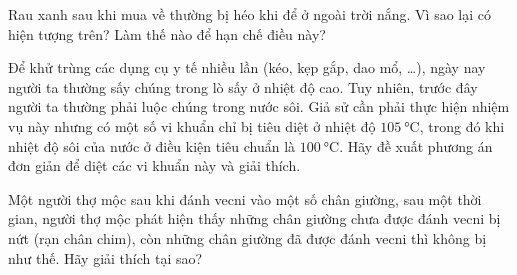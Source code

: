 \begin{ex}
	Rau xanh sau khi mua về thường bị héo khi để ở ngoài trời nắng. Vì sao lại có hiện tượng trên? Làm thế nào để hạn chế điều này?
\end{ex}
\begin{ex}
	Để khử trùng các dụng cụ y tế nhiều lần (kéo, kẹp gắp, dao mổ, \dots), ngày nay người ta thường sấy chúng trong lò sấy ở nhiệt độ cao. Tuy nhiên, trước đây người ta thường phải luộc chúng trong nước sôi. Giả sử cần phải thực hiện nhiệm vụ này nhưng có một số vi khuẩn chỉ bị tiêu diệt ở nhiệt độ $\SI{105}{\celsius}$, trong đó khi nhiệt độ sôi của nước ở điều kiện tiêu chuẩn là $\SI{100}{\celsius}$. Hãy đề xuất phương án đơn giản để diệt các vi khuẩn này và giải thích.
\end{ex}
\begin{ex}
Một người thợ mộc sau khi đánh vecni vào một số chân giường, sau một thời gian, người thợ mộc phát hiện thấy những chân giường chưa được đánh vecni bị nứt (rạn chân chim), còn những chân giường đã được đánh vecni thì không bị như thế. Hãy giải thích tại sao?
\end{ex}
